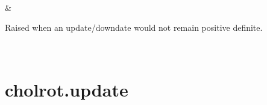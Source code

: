 \documentclass[a4paper,11pt,english]{sphinxmanual}
\begin{document}
\begin{savenotes}
\begin{longtable}{}
\begin{varwidth}[t]{}
\sphinxbeforeendvarwidth
\end{varwidth}%
\\
\sphinxhline\begin{varwidth}[t]{}
\sphinxAtStartPar
{\hyperref[\detokenize{generated/cholrot.NonPositiveDefiniteError:cholrot.NonPositiveDefiniteError}]{}}
\sphinxbeforeendvarwidth
\end{varwidth}%
&\begin{varwidth}[t]{}
\sphinxAtStartPar
Raised when an update/downdate would not remain positive definite.
\sphinxbeforeendvarwidth
\end{varwidth}%
\\
\sphinxbottomrule
\end{longtable}
\sphinxtableafterendhook
\sphinxatlongtableend
\end{savenotes}

\sphinxstepscope


\section{cholrot.update}
\label{\detokenize{generated/cholrot.update:cholrot-update}}\label{\detokenize{generated/cholrot.update::doc}}
\end{document}
